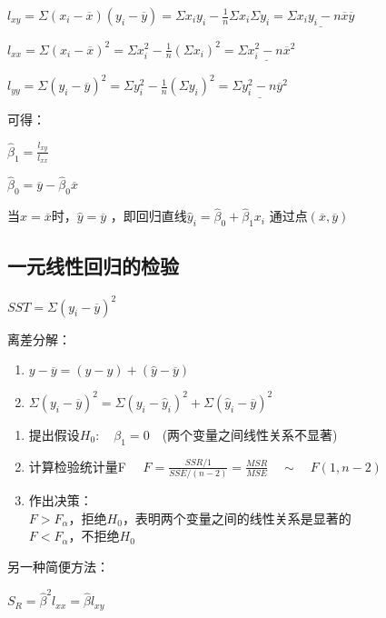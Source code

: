 \documentclass[UTF8,10pt]{book}
\begin{document}
\(  l_{xy} = \Sigma(x_i-\overline{x})(y_i-\overline{y}) = \Sigma x_i y_i - \frac{1}{n}\Sigma x_i \Sigma y_i = \underline{\Sigma x_i y_i - n\overline{x}\overline{y} }  \)

\(  l_{xx} = \Sigma (x_i - \overline{x})^2 = \Sigma x_i^2 - \frac{1}{n}(\Sigma x_i)^2  =  \underline{\Sigma x_i^2 - n \overline{x}^2} \)

\(  l_{yy} = \Sigma (y_i - \overline{y})^2 = \Sigma y_i^2 - \frac{1}{n}(\Sigma y_i)^2   =  \underline{\Sigma y_i^2 - n \overline{y}^2} \)

可得：

\(  \hat{\beta}_1 = \frac{l_{xy}} { l_{xx}}  \)

\(  \hat{\beta}_0 = \overline{y} - \hat{\beta}_0 \overline{x}  \)

当\(x=\overline{x}\)时，\(\hat{y}=\overline{y}\)
，即回归直线\(\hat{y}_i=\hat{\beta}_0+\hat{\beta}_1 x_i\)
通过点\((\overline{x},\overline{y})\)

\subsection{一元线性回归的检验}\label{header-n104}

\(SST = \Sigma(y_i - \overline{y})^2\)

离差分解：

\begin{enumerate}
	\def\labelenumi{\arabic{enumi}.}
	\item
	\(   y-\overline{y} = (y-\hat{y})+(\hat{y}-\overline{y})   \) 
	\item
	\(   \Sigma (y_i-\overline{y})^2 =  \Sigma (y_i-\hat{y}_i)^2+\Sigma(\hat{y}_i-\overline{y})^2        \)
\end{enumerate}

\begin{enumerate}
	\def\labelenumi{\arabic{enumi}.}
	\item
	提出假设\(H_0 :\quad \beta_1 = 0 \quad\)(两个变量之间线性关系不显著)
	\item
	计算检验统计量F
	\(\quad F = \frac{SSR/1}{SSE/(n-2)} =\frac{MSR}{MSE} \quad \sim \quad F(1,n-2) \)
	\item
	作出决策：\\
	\(F>F_{\alpha}\)，拒绝\(H_0\)，表明两个变量之间的线性关系是显著的\\
	\(F<F_{\alpha}\)，不拒绝\(H_0\)
\end{enumerate}

另一种简便方法：

\( S_R = \hat{\beta}^2 l_{xx}=\hat{\beta}l_{xy} \)
\end{document}
